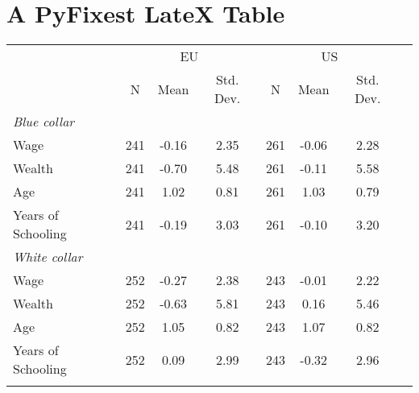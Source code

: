 \documentclass{article}%
\begin{document}
%
\normalsize%
\section{A PyFixest LateX Table}%
\label{sec:APyFixestLateXTable}%


\begin{table}[htbp]%
\renewcommand\cellalign{t}
\begin{threeparttable}
\begin{tabular}{lccccccc}
\toprule
 & \multicolumn{3}{c}{EU} & \multicolumn{3}{c}{US} \\
\cmidrule(lr){2-4} \cmidrule(lr){5-7}
 & N & Mean & Std. Dev. & N & Mean & Std. Dev. \\
\midrule
\addlinespace
\emph{Blue collar} \\
\addlinespace
Wage & 241 & -0.16 & 2.35 & 261 & -0.06 & 2.28 \\
Wealth & 241 & -0.70 & 5.48 & 261 & -0.11 & 5.58 \\
Age & 241 & 1.02 & 0.81 & 261 & 1.03 & 0.79 \\
Years of Schooling & 241 & -0.19 & 3.03 & 261 & -0.10 & 3.20 \\
\addlinespace
\midrule
\addlinespace
\emph{White collar} \\
\addlinespace
Wage & 252 & -0.27 & 2.38 & 243 & -0.01 & 2.22 \\
Wealth & 252 & -0.63 & 5.81 & 243 & 0.16 & 5.46 \\
Age & 252 & 1.05 & 0.82 & 243 & 1.07 & 0.82 \\
Years of Schooling & 252 & 0.09 & 2.99 & 243 & -0.32 & 2.96 \\
\addlinespace
\bottomrule
\end{tabular}
\footnotesize
\end{threeparttable}%
\end{table}

%
\end{document}
